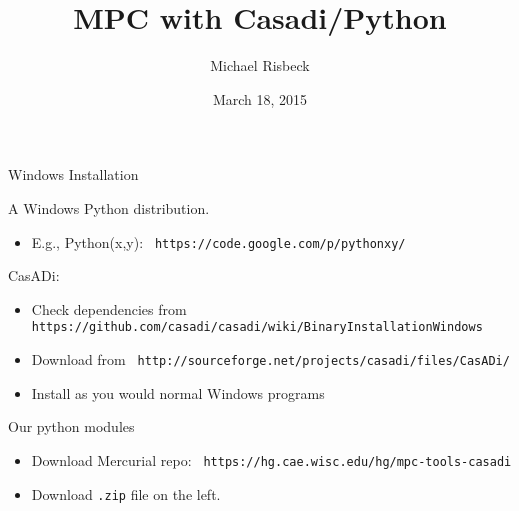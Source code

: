 \documentclass[xcolor=dvipsnames]{beamer}
\title{MPC with Casadi/Python}
\date{March 18, 2015}
\author{Michael Risbeck}
\newcommand{\smallurl}[2][\footnotesize]{\texttt{#1 #2}}
\begin{document}
\frame{\titlepage}



\begin{frame}{Windows Installation}
    
    A Windows Python distribution.
    \begin{itemize}
        \item E.g., Python(x,y): \smallurl{https://code.google.com/p/pythonxy/}
    \end{itemize}
    
    \medskip
    
    CasADi:
    \begin{itemize}
        \item Check dependencies from \smallurl{https://github.com/casadi/casadi/wiki/BinaryInstallationWindows}
        \item Download from \smallurl{http://sourceforge.net/projects/casadi/files/CasADi/}
        \item Install as you would normal Windows programs
    \end{itemize}
    
    \medskip
    
    Our python modules
    \begin{itemize}
        \item Download Mercurial repo: \smallurl{https://hg.cae.wisc.edu/hg/mpc-tools-casadi}
        \item Download \texttt{.zip} file on the left.
    \end{itemize}
    
\end{frame}
\end{document}
